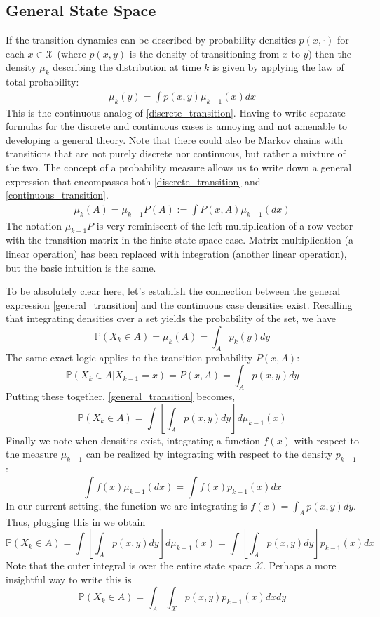 \documentclass[12pt]{article}
\newcommand{\Prob}{\mathbb{P}}
\begin{document}
\subsection{General State Space}
If the transition dynamics can be described by probability densities $p(x, \cdot)$ for each $x \in \mathcal{X}$ (where $p(x, y)$ is the density of transitioning from $x$ to $y$) then the 
density $\mu_k$ describing the distribution at time $k$ is given by applying the law of total probability:
\begin{align}
\mu_k(y) = \int p(x, y) \mu_{k-1}(x) dx \label{continuous_transition}
\end{align}
This is the continuous analog of \ref{discrete_transition}. Having to write separate formulas for the discrete and continuous cases is annoying and not amenable to developing a general 
theory. Note that there could also be Markov chains with transitions that are not purely discrete nor continuous, but rather a mixture of the two. The concept of a probability measure allows 
us to write down a general expression that encompasses both \ref{discrete_transition} and \ref{continuous_transition}. 
\begin{align}
\mu_k(A) = \mu_{k - 1}P(A) := \int P(x, A)\mu_{k - 1}(dx) \label{general_transition}
\end{align}
The notation $\mu_{k - 1}P$ is very reminiscent of the left-multiplication of a row vector with the transition matrix in the finite state space case. Matrix multiplication (a linear operation) has 
been replaced with integration (another linear operation), but the basic intuition is the same. 

To be absolutely clear here, let's establish the connection between the general expression \ref{general_transition} and the continuous case densities exist. Recalling that integrating densities over 
a set yields the probability of the set, we have 
\[\Prob(X_k \in A) = \mu_k(A) = \int_A p_k(y) dy\]
The same exact logic applies to the transition probability $P(x, A)$:
\[\Prob(X_k \in A|X_{k - 1} = x) = P(x, A) = \int_A p(x, y) dy \]
Putting these together, \ref{general_transition} becomes,
\[\Prob(X_k \in A) = \int \left[ \int_A p(x, y) dy \right] d\mu_{k-1}(x)\]
Finally we note when densities exist, integrating a function $f(x)$ with respect to the measure $\mu_{k-1}$ can be realized by integrating with respect to the density $p_{k-1}$:
\[\int f(x) \mu_{k-1}(dx) = \int f(x) p_{k-1}(x) dx\]
In our current setting, the function we are integrating is $f(x) = \int_A p(x, y) dy$. Thus, plugging this in we obtain 
\[\Prob(X_k \in A) = \int \left[ \int_A p(x, y) dy \right] d\mu_{k-1}(x) = \int \left[ \int_A p(x, y) dy \right] p_{k-1}(x) dx\]
Note that the outer integral is over the entire state space $\mathcal{X}$. Perhaps a more insightful way to write this is 
\[\Prob(X_k \in A)  = \int_A \int_{\mathcal{X}} p(x, y) p_{k-1}(x) dx dy\]
\end{document}
